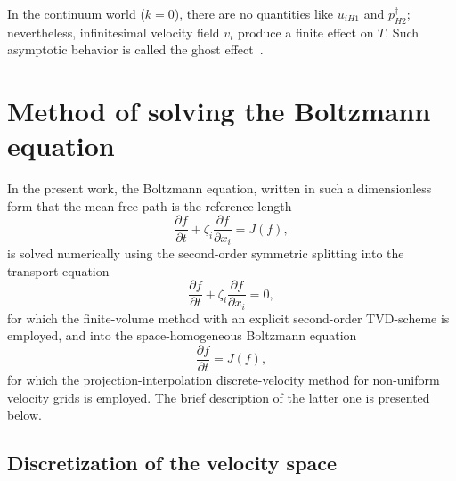 \documentclass[10pt]{article}
\newcommand{\pder}[2][]{\frac{\partial#1}{\partial#2}}
\begin{document}
In the continuum world (\(k=0\)), there are no quantities like \(u_{iH1}\) and \(p^\dag_{H2}\);
nevertheless, infinitesimal velocity field \(v_i\) produce a finite effect on \(T\).
Such asymptotic behavior is called the ghost effect~\cite{Sone2002, Sone2007}.

\section{Method of solving the Boltzmann equation}

In the present work, the Boltzmann equation, written in such a dimensionless form
that the mean free path is the reference length
\begin{equation}\label{eq:Boltzmann_equation2}
    \pder[f]{t} + \zeta_i\pder[f]{x_i} = J(f),
\end{equation}
is solved numerically using the second-order symmetric splitting into the transport equation
\begin{equation}\label{eq:split_transport}
    \pder[f]{t} + \zeta_i\pder[f]{x_i} = 0,
\end{equation}
for which the finite-volume method with an explicit second-order TVD-scheme is employed,
and into the space-homogeneous Boltzmann equation
\begin{equation}\label{eq:split_collisions}
    \pder[f]{t} = J(f),
\end{equation}
for which the projection-interpolation discrete-velocity method
for non-uniform velocity grids is employed.
The brief description of the latter one is presented below.

\subsection{Discretization of the velocity space}
\end{document}
